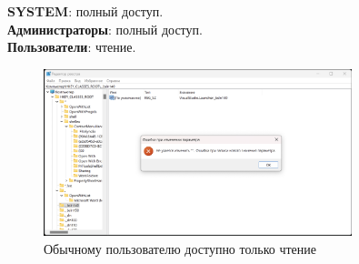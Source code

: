 \documentclass[a4paper, 14pt]{report}
\begin{document}
\begin{enumerate}
{          \begin{tcolorbox}[colback=white!95!gray, colframe=black, title=Права доступа]
              \textbf{SYSTEM}: полный доступ.\\
              \textbf{Администраторы}: полный доступ.\\
              \textbf{Пользователи}: чтение.
          \end{tcolorbox}
          \begin{figure}[H]
              \centering
              \includegraphics[width=0.8\textwidth]{../images/HKCR_users.png}
              \caption{Обычному пользователю доступно только чтение}
          \end{figure}
          }
\end{enumerate}
\end{document}
